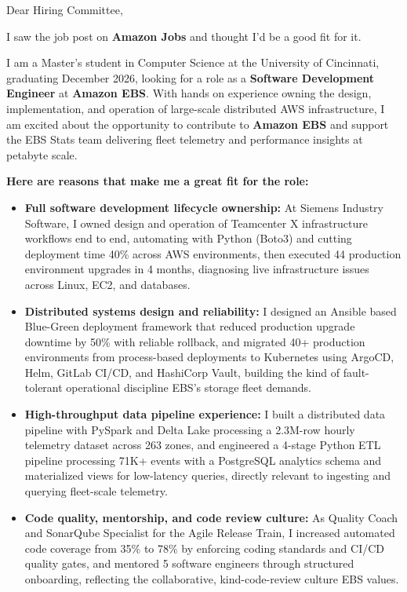 \documentclass[11pt]{letter}
\date{}
\begin{document}
\begin{letter}{}

\opening{Dear Hiring Committee,}

I saw the job post on \textbf{Amazon Jobs} and thought I'd be a good fit for it.

I am a Master's student in Computer Science at the University of Cincinnati, graduating December 2026, looking for a role as a \textbf{Software Development Engineer} at \textbf{Amazon EBS}. With hands on experience owning the design, implementation, and operation of large-scale distributed AWS infrastructure, I am excited about the opportunity to contribute to \textbf{Amazon EBS} and support the EBS Stats team delivering fleet telemetry and performance insights at petabyte scale.

\textbf{Here are reasons that make me a great fit for the role:}

\begin{itemize}[leftmargin=*, itemsep=0.45em]
    \item \textbf{Full software development lifecycle ownership:} At Siemens Industry Software, I owned design and operation of Teamcenter X infrastructure workflows end to end, automating with Python (Boto3) and cutting deployment time 40\% across AWS environments, then executed 44 production environment upgrades in 4 months, diagnosing live infrastructure issues across Linux, EC2, and databases.

    \item \textbf{Distributed systems design and reliability:} I designed an Ansible based Blue-Green deployment framework that reduced production upgrade downtime by 50\% with reliable rollback, and migrated 40+ production environments from process-based deployments to Kubernetes using ArgoCD, Helm, GitLab CI/CD, and HashiCorp Vault, building the kind of fault-tolerant operational discipline EBS's storage fleet demands.

    \item \textbf{High-throughput data pipeline experience:} I built a distributed data pipeline with PySpark and Delta Lake processing a 2.3M-row hourly telemetry dataset across 263 zones, and engineered a 4-stage Python ETL pipeline processing 71K+ events with a PostgreSQL analytics schema and materialized views for low-latency queries, directly relevant to ingesting and querying fleet-scale telemetry.

    \item \textbf{Code quality, mentorship, and code review culture:} As Quality Coach and SonarQube Specialist for the Agile Release Train, I increased automated code coverage from 35\% to 78\% by enforcing coding standards and CI/CD quality gates, and mentored 5 software engineers through structured onboarding, reflecting the collaborative, kind-code-review culture EBS values.
\end{itemize}


\end{letter}
\end{document}
